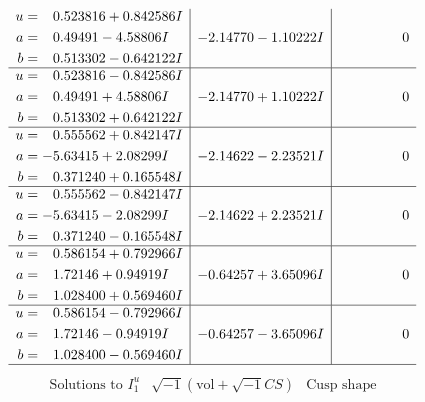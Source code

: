 \documentclass[1p]{elsarticle_modified}
\theoremstyle{definition}
\newcommand{\I}{\sqrt{-1}}
\begin{document}
$$\begin{array}{c|c|c}
\begin{aligned}
u &= \phantom{-}0.523816 + 0.842586 I \\
a &= \phantom{-}0.49491 - 4.58806 I \\
b &= \phantom{-}0.513302 - 0.642122 I\end{aligned}
 & -2.14770 - 1.10222 I & \phantom{-0.000000 } 0 \\ \hline\begin{aligned}
u &= \phantom{-}0.523816 - 0.842586 I \\
a &= \phantom{-}0.49491 + 4.58806 I \\
b &= \phantom{-}0.513302 + 0.642122 I\end{aligned}
 & -2.14770 + 1.10222 I & \phantom{-0.000000 } 0 \\ \hline\begin{aligned}
u &= \phantom{-}0.555562 + 0.842147 I \\
a &= -5.63415 + 2.08299 I \\
b &= \phantom{-}0.371240 + 0.165548 I\end{aligned}
 & -2.14622 - 2.23521 I & \phantom{-0.000000 } 0 \\ \hline\begin{aligned}
u &= \phantom{-}0.555562 - 0.842147 I \\
a &= -5.63415 - 2.08299 I \\
b &= \phantom{-}0.371240 - 0.165548 I\end{aligned}
 & -2.14622 + 2.23521 I & \phantom{-0.000000 } 0 \\ \hline\begin{aligned}
u &= \phantom{-}0.586154 + 0.792966 I \\
a &= \phantom{-}1.72146 + 0.94919 I \\
b &= \phantom{-}1.028400 + 0.569460 I\end{aligned}
 & -0.64257 + 3.65096 I & \phantom{-0.000000 } 0 \\ \hline\begin{aligned}
u &= \phantom{-}0.586154 - 0.792966 I \\
a &= \phantom{-}1.72146 - 0.94919 I \\
b &= \phantom{-}1.028400 - 0.569460 I\end{aligned}
 & -0.64257 - 3.65096 I & \phantom{-0.000000 } 0\\
 \hline 
 \end{array}$$\newpage$$\begin{array}{c|c|c}  
\text{Solutions to }I^u_{1}& \I (\text{vol} + \sqrt{-1}CS) & \text{Cusp shape}\\

\end{array}$$
\end{document}
